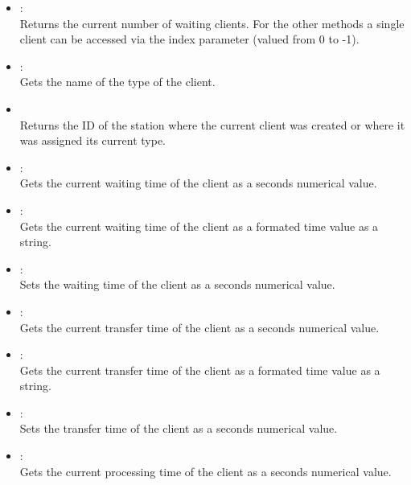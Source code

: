 \begin{itemize}

\item
{}:\\
Returns the current number of waiting clients. For the other
methods a single client can be accessed via the index parameter
(valued from 0 to -1).

\item
{}:\\
Gets the name of the type of the client.

\item
{}\\
Returns the ID of the station where the current client was created or where it was assigned its current type.

\item
{}:\\
Gets the current waiting time of the client as a seconds numerical value.

\item
{}:\\
Gets the current waiting time of the client as a formated time value as a string.

\item
{}:\\
Sets the waiting time of the client as a seconds numerical value.

\item
{}:\\
Gets the current transfer time of the client as a seconds numerical value.

\item
{}:\\
Gets the current transfer time of the client as a formated time value as a string.

\item
{}:\\
Sets the transfer time of the client as a seconds numerical value.

\item
{}:\\
Gets the current processing time of the client as a seconds numerical value.


\end{itemize}
